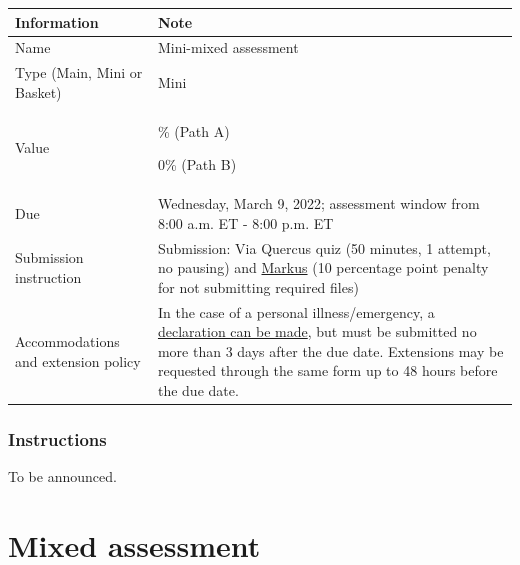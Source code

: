 \documentclass[
  openany]{book}
\begin{document}
\begin{longtable}[]{@{}
  >{\raggedright\arraybackslash}p{}
  >{\raggedright\arraybackslash}p{}@{}}
\toprule
\textbf{Information} & \textbf{Note} \\
\midrule
\endhead
Name & Mini-mixed assessment \\
Type (Main, Mini or Basket) & Mini \\
Value & 5\% (Path A)

0\% (Path B) \\
Due & Wednesday, March 9, 2022; assessment window from 8:00 a.m. ET - 8:00 p.m. ET \\
Submission instruction & Submission: Via Quercus quiz (50 minutes, 1 attempt, no pausing) and \href{https://markus-ds.teach.cs.toronto.edu/}{Markus} (10 percentage point penalty for not submitting required files) \\
Accommodations and extension policy & In the case of a personal illness/emergency, a \href{https://forms.office.com/Pages/ResponsePage.aspx?id=JsKqeAMvTUuQN7RtVsVSEOKHUU3SzAJJhmOKjJhDWEpUNTFDSzhZTFlXUzVYMVlNM1FEUTRZMkVWOC4u}{declaration can be made}, but must be submitted no more than 3 days after the due date. Extensions may be requested through the same form up to 48 hours before the due date. \\
\bottomrule
\end{longtable}

\hypertarget{instructions-2}{%
\subsection{Instructions}\label{instructions-2}}

To be announced.

\hypertarget{mixed-assessment}{%
\chapter{Mixed assessment}\label{mixed-assessment}}
\end{document}
